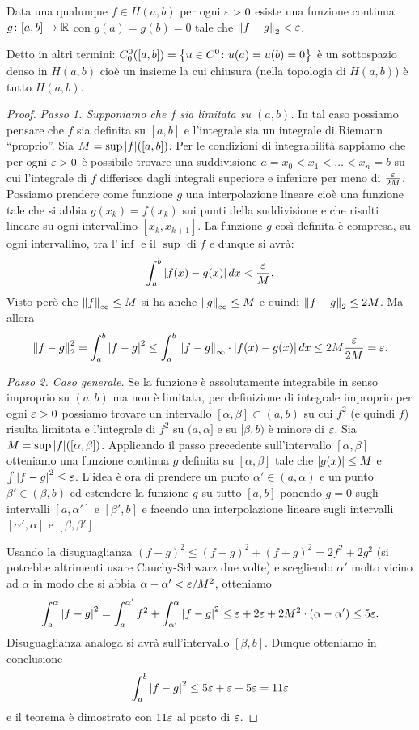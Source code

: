 \begin{theorem}
Data una qualunque $f\in H(a, b)$ per ogni $\varepsilon>0$
esiste una funzione continua $g\colon [a,b]\to {\mathbb R}$
con $g(a)=g(b)=0$ tale che ${\left\Vert f-g\right\Vert}_2<\varepsilon$.

Detto in altri termini: $C^0_0([a,b])={\left\{ u\in C^0\colon u(a)=u(b)=0 \right\}}$ è un 
sottospazio denso in $H(a,b)$
cioè un insieme la cui chiusura (nella topologia di $H(a,b)$) 
è tutto $H(a,b)$.
\end{theorem}
%
\begin{proof}
\emph{Passo 1. Supponiamo che $f$ sia limitata su $(a,b)$.}
In tal caso possiamo pensare che $f$ sia definita su $[a,b]$
e l'integrale sia un integrale di Riemann ``proprio''.
Sia $M=\sup {\left|f\right|}([a,b])$.
Per le condizioni di integrabilità sappiamo che per ogni $\varepsilon>0$ è possibile
trovare una suddivisione $a=x_0 < x_1 < \dots < x_n =b$ su cui l'integrale
di $f$ differisce dagli integrali superiore e inferiore per meno di $\frac{\varepsilon}{2M}$.
Possiamo prendere come funzione $g$ una interpolazione lineare
cioè una funzione tale che si abbia $g(x_k) = f(x_k)$ sui punti della suddivisione
e che risulti lineare su ogni intervallino $[x_k,x_{k+1}]$. La funzione
$g$ così definita è compresa, su ogni intervallino, tra l'$\inf$ e il $\sup$
di $f$ e dunque si avrà:
\[
 \int_a^b {\left|f(x)-g(x)\right|}\, dx < \frac{\varepsilon}{M}.
\]
Visto però che ${\left\Vert f\right\Vert}_\infty\le M$
si ha anche ${\left\Vert g\right\Vert}_\infty\le M$ e quindi ${\left\Vert f-g\right\Vert}_2\le 2M$.
Ma allora
\[
  {\left\Vert f-g\right\Vert}_2^2 = \int_a^b {\left|f-g\right|}^2
  \le \int_a^b {\left\Vert f-g\right\Vert}_\infty \cdot {\left|f(x)-g(x)\right|}\, dx
  \le 2M \frac{\varepsilon}{2M} = \varepsilon.
\]

\emph{Passo 2. Caso generale.}
Se la funzione è assolutamente 
integrabile in senso improprio su $(a,b)$ ma non è limitata, per
definizione di integrale improprio per ogni $\varepsilon>0$ possiamo trovare un intervallo
$[\alpha,\beta]\subset (a,b)$
su cui $f^2$ (e quindi $f$) risulta limitata e
l'integrale di $f^2$ su $(a,\alpha]$ e su $[\beta,b)$
è minore di $\varepsilon$. 
Sia $M=\sup {\left|f\right|}([\alpha,\beta])$.
Applicando il passo precedente sull'intervallo $[\alpha,\beta]$ 
otteniamo una funzione continua $g$ definita su $[\alpha,\beta]$ 
tale che ${\left|g(x)\right|}\le M$
e $\int{\left|f-g\right|}^2\le \varepsilon$.
L'idea è ora di prendere un punto $\alpha'\in(a,\alpha)$ 
e un punto $\beta'\in(\beta,b)$ ed estendere la funzione 
$g$ su tutto $[a,b]$ ponendo $g=0$ sugli intervalli 
$[a,\alpha']$ e $[\beta',b]$ e facendo una interpolazione 
lineare sugli intervalli $[\alpha',\alpha]$ e $[\beta,\beta']$.

Usando la disuguaglianza 
$(f-g)^2 \le (f-g)^2+(f+g)^2 = 2f^2+2g^2$
(si potrebbe altrimenti usare Cauchy-Schwarz due volte)
e scegliendo $\alpha'$ molto vicino ad 
$\alpha$ in modo che si abbia $\alpha-\alpha'<\varepsilon/M^2$,
otteniamo
\[
  \int_a^\alpha {\left|f-g\right|}^2 
  = \int_a^{\alpha'} f^2 + \int_{\alpha'}^\alpha {\left|f-g\right|}^2
  \le \varepsilon + 2\varepsilon + 2M^2\cdot(\alpha-\alpha')
  \le 5\varepsilon.
\]
Disuguaglianza analoga si avrà sull'intervallo $[\beta,b]$.
Dunque otteniamo in conclusione 
\[
\int_a^b {\left|f-g\right|}^2
\le 5\varepsilon + \varepsilon + 5\varepsilon  = 11 \varepsilon
\]
e il teorema è dimostrato con $11\varepsilon$ al posto di $\varepsilon$.
\end{proof}

